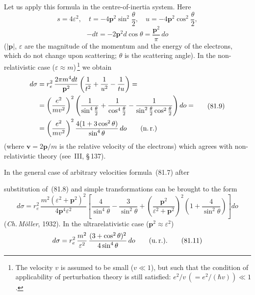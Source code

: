 Let us apply this formula in the centre-of-inertia system. Here
\begin{equation}
s = 4\varepsilon^2,\quad t = -4\mathbf{p}^2\sin^2\frac{\theta}{2},\quad u = -4\mathbf{p}^2\cos^2\frac{\theta}{2},
\tag{81.8}
\end{equation}
\[
-dt = -2\mathbf{p}^2 d\cos\theta = \frac{\mathbf{p}^2}{\pi}\,do
\]
($|\mathbf{p}|$, $\varepsilon$ are the magnitude of the momentum and the energy of the electrons, which do not change upon scattering; $\theta$ is the scattering angle). In the non-relativistic case ($\varepsilon \approx m$)\,\footnote{The velocity $v$ is assumed to be small ($v \ll 1$), but such that the condition of applicability of perturbation theory is still satisfied: $e^2/v\,(= e^2/(\hbar v)) \ll 1$.} we obtain
\begin{equation}
\begin{split}
d\sigma &= r_e^2\,\frac{2\pi m^4 dt}{\mathbf{p}^2}\left(\frac{1}{t^2} + \frac{1}{u^2} - \frac{1}{tu}\right) =\\
&= \left(\frac{e^2}{mv^2}\right)^2\left(\frac{1}{\sin^4\frac{\theta}{2}} + \frac{1}{\cos^4\frac{\theta}{2}} - \frac{1}{\sin^2\frac{\theta}{2}\cos^2\frac{\theta}{2}}\right)do =\\
&= \left(\frac{e^2}{mv^2}\right)^2\frac{4(1 + 3\cos^2\theta)}{\sin^4\theta}\,do\qquad\text{(n.\,r.)}
\end{split}
\tag{81.9}
\end{equation}
(where $\mathbf{v} = 2\mathbf{p}/m$ is the relative velocity of the electrons) which agrees with non-relativistic theory (see~III, \S\,137).

In the general case of arbitrary velocities formula~(81.7) after

substitution of~(81.8) and simple transformations can be brought to the form
\begin{equation}
d\sigma = r_e^2\,\frac{m^2(\varepsilon^2+\mathbf{p}^2)^2}{4\mathbf{p}^4\varepsilon^2}\left[\frac{4}{\sin^4\theta}-\frac{3}{\sin^2\theta}+\left(\frac{\mathbf{p}^2}{\varepsilon^2+\mathbf{p}^2}\right)^2\left(1+\frac{4}{\sin^2\theta}\right)\right]do
\tag{81.10}
\end{equation}
(\textit{Ch.\,M\"oller}, 1932). In the ultrarelativistic case ($\mathbf{p}^2 \approx \varepsilon^2$)
\begin{equation}
d\sigma = r_e^2\,\frac{m^2}{\varepsilon^2}\,\frac{(3+\cos^2\theta)^2}{4\sin^4\theta}\,do\qquad\text{(u.\,r.)}.
\tag{81.11}
\end{equation}

